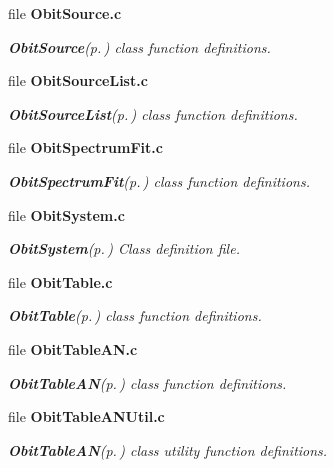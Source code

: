 \begin{CompactItemize}
\item 
file {\bf Obit\-Source.c}
\begin{CompactList}\small\item\em {\bf Obit\-Source}{\rm (p.\,\pageref{structObitSource})} class function definitions. \item\end{CompactList}

\item 
file {\bf Obit\-Source\-List.c}
\begin{CompactList}\small\item\em {\bf Obit\-Source\-List}{\rm (p.\,\pageref{structObitSourceList})} class function definitions. \item\end{CompactList}

\item 
file {\bf Obit\-Spectrum\-Fit.c}
\begin{CompactList}\small\item\em {\bf Obit\-Spectrum\-Fit}{\rm (p.\,\pageref{structObitSpectrumFit})} class function definitions. \item\end{CompactList}

\item 
file {\bf Obit\-System.c}
\begin{CompactList}\small\item\em {\bf Obit\-System}{\rm (p.\,\pageref{structObitSystem})} Class definition file. \item\end{CompactList}

\item 
file {\bf Obit\-Table.c}
\begin{CompactList}\small\item\em {\bf Obit\-Table}{\rm (p.\,\pageref{structObitTable})} class function definitions. \item\end{CompactList}

\item 
file {\bf Obit\-Table\-AN.c}
\begin{CompactList}\small\item\em {\bf Obit\-Table\-AN}{\rm (p.\,\pageref{structObitTableAN})} class function definitions. \item\end{CompactList}

\item 
file {\bf Obit\-Table\-ANUtil.c}
\begin{CompactList}\small\item\em {\bf Obit\-Table\-AN}{\rm (p.\,\pageref{structObitTableAN})} class utility function definitions. \item\end{CompactList}


\end{CompactItemize}
